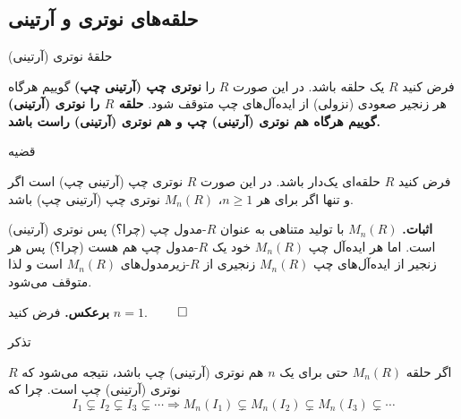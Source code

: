 \section{}

\subsection*{حلقه‌های نوتری و آرتینی}




\begin{frame}{حلقهٔ نوتری (آرتینی)}
    \begin{definition}
        فرض کنید $R$ یک حلقه باشد. در این صورت $R$ را \textbf{نوتری چپ (آرتینی چپ)} گوییم هرگاه هر زنجیر صعودی (نزولی) از ایده‌آل‌های چپ متوقف شود.
        \textbf{حلقه $R$ را نوتری (آرتینی) گوییم هرگاه هم نوتری (آرتینی) چپ و هم نوتری (آرتینی) راست باشد.}
    \end{definition}

\end{frame}



\begin{frame}{قضیه}
    \begin{theorem}
        فرض کنید $R$ حلقه‌ای یک‌دار باشد. در این صورت $R$ نوتری چپ (آرتینی چپ) است اگر و تنها اگر برای هر $n \geqslant 1$، $M_n(R)$ نوتری چپ (آرتینی چپ) باشد.

    \end{theorem}
    \bigskip

    \textbf{اثبات.}
    $M_n(R)$ با تولید متناهی به عنوان $R$-مدول چپ (چرا؟) پس نوتری (آرتینی) است.
    اما هر ایده‌آل چپ $M_n(R)$ خود یک $R$-مدول چپ هم هست (چرا؟) پس هر زنجیر از ایده‌آل‌های چپ $M_n(R)$ زنجیری از $R$-زیرمدول‌های $M_n(R)$ است و لذا متوقف می‌شود.

    \textbf{برعکس.}
    فرض کنید
    \(n = 1\). \hfill\(\qed\)



\end{frame}


\begin{frame}{تذکر}

    \begin{remark}
        اگر حلقه $M_n(R)$ حتی برای یک $n$ هم نوتری (آرتینی) چپ باشد،  نتیجه می‌شود که $R$ نوتری (آرتینی) چپ است. چرا که
        \[
            I_1 \subsetneq I_2 \subsetneq I_3 \subsetneq \cdots \Rightarrow M_n(I_1) \subsetneq M_n(I_2) \subsetneq M_n(I_3) \subsetneq \cdots
        \]
    \end{remark}



\end{frame}


